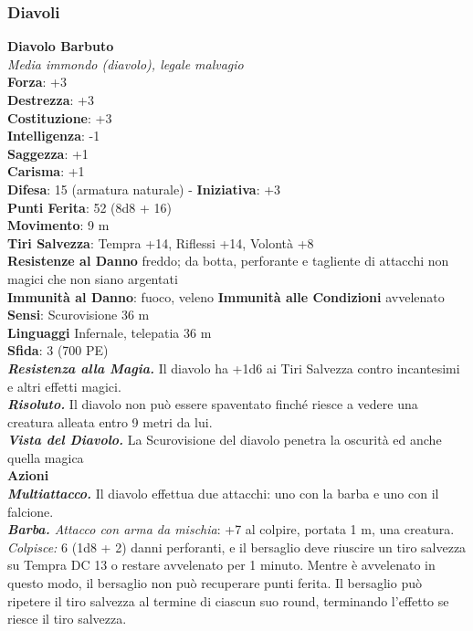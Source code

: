 \begin{multicols}{2}
\subsubsection{Diavoli}

\medskip\textbf{Diavolo Barbuto}\\
\emph{Media immondo (diavolo), legale malvagio}\\
\textbf{Forza}: +3\\
\textbf{Destrezza}: +3\\
\textbf{Costituzione}: +3\\
\textbf{Intelligenza}: -1\\
\textbf{Saggezza}: +1\\
\textbf{Carisma}: +1\\
\textbf{Difesa}: 15 (armatura naturale) - \textbf{Iniziativa}: +3\\
\textbf{Punti Ferita}: 52 (8d8 + 16)\\
\textbf{Movimento}: 9 m\\
\textbf{Tiri Salvezza}: Tempra +14, Riflessi +14, Volontà +8\\
\textbf{Resistenze al Danno} freddo; da botta, perforante e tagliente di attacchi non magici che non siano argentati\\
\textbf{Immunità al Danno}: fuoco, veleno \textbf{Immunità alle Condizioni} avvelenato\\
\textbf{Sensi}: Scurovisione 36 m\\
\textbf{Linguaggi} Infernale, telepatia 36 m \\
\textbf{Sfida}: 3 (700 PE)\smallskip\\
\emph{\textbf{Resistenza alla Magia.}} Il diavolo ha +1d6 ai Tiri Salvezza contro incantesimi e altri effetti magici.\\
\emph{\textbf{Risoluto.}} Il diavolo non può essere spaventato finché riesce a vedere una creatura alleata entro 9 metri da lui.\\
\emph{\textbf{Vista del Diavolo.}} La Scurovisione del diavolo penetra la oscurità ed anche quella magica\\
\smallskip\textbf{Azioni}\\
\emph{\textbf{Multiattacco.}} Il diavolo effettua due attacchi: uno con la barba e uno con il falcione.\\
\emph{\textbf{Barba.} Attacco con arma da mischia}: +7 al colpire, portata 1 m, una creatura.\\
\emph{Colpisce:} 6 (1d8 + 2) danni perforanti, e il bersaglio deve riuscire un tiro salvezza su Tempra DC  13 o restare avvelenato per 1 minuto. Mentre è avvelenato in questo modo, il bersaglio non può recuperare punti ferita. Il bersaglio può ripetere il tiro salvezza al termine di ciascun suo round, terminando l'effetto se riesce il tiro salvezza.\\

\end{multicols}
